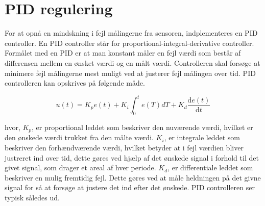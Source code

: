 \section{PID regulering}
For at opnå en mindskning i fejl målingerne fra sensoren, indplementeres en PID controller. En PID controller står for proportional-integral-derivative controller. Formålet med en PID er at man konstant måler en fejl værdi som består af differensen mellem en ønsket værdi og en målt værdi. Controlleren skal forsøge at minimere fejl målingerne mest muligt ved at justerer fejl målingen over tid.\newline
\newline
PID controlleren kan opskrives på følgende måde.

\begin{equation} 
u(t) = K_p e(t) + K_i\int_{0}^{t}e(T)dT + K_d\frac{\mathrm{d} e(t)}{\mathrm{d} t}
\end{equation}

hvor, 
\newline
$K_{p}$, er proportional leddet som beskriver den nuværende værdi, hvilket er den ønskede værdi trukket fra den målte værdi. 
\newline
$K_{i}$, er integrale leddet som beskriver den forhændværende værdi, hvilket betyder at i fejl værdien bliver justreret ind over tid, dette gøres ved hjælp af det ønskede signal i forhold til det givet signal, som drager et areal af hver periode.   
\newline
$K_{d}$, er differentiale leddet som beskriver en mulig fremtidig fejl. Dette gøres ved at måle heldningen på det givne signal for så at forsøge at justere det ind efter det ønskede. 
\newline
PID controlleren ser typisk således ud. 

